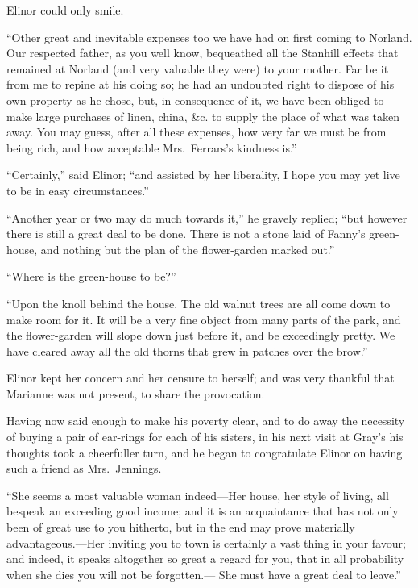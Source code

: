 Elinor could only smile.

``Other great and inevitable expenses too we have
had on first coming to Norland.  Our respected father,
as you well know, bequeathed all the Stanhill effects
that remained at Norland (and very valuable they were)
to your mother.  Far be it from me to repine at his
doing so; he had an undoubted right to dispose of his
own property as he chose, but, in consequence of it,
we have been obliged to make large purchases of linen,
china, \&c. to supply the place of what was taken away.
You may guess, after all these expenses, how very far we
must be from being rich, and how acceptable Mrs.\ Ferrars's
kindness is.''

``Certainly,'' said Elinor; ``and assisted by her liberality,
I hope you may yet live to be in easy circumstances.''

``Another year or two may do much towards it,''
he gravely replied; ``but however there is still a great
deal to be done.  There is not a stone laid of Fanny's
green-house, and nothing but the plan of the flower-garden
marked out.''

``Where is the green-house to be?''

``Upon the knoll behind the house.  The old
walnut trees are all come down to make room for it.
It will be a very fine object from many parts of the park,
and the flower-garden will slope down just before it,
and be exceedingly pretty.  We have cleared away all the old
thorns that grew in patches over the brow.''

Elinor kept her concern and her censure to herself;
and was very thankful that Marianne was not present,
to share the provocation.

Having now said enough to make his poverty clear,
and to do away the necessity of buying a pair of ear-rings
for each of his sisters, in his next visit at Gray's
his thoughts took a cheerfuller turn, and he began to
congratulate Elinor on having such a friend as Mrs.\ Jennings.

``She seems a most valuable woman indeed---Her house,
her style of living, all bespeak an exceeding good income;
and it is an acquaintance that has not only been
of great use to you hitherto, but in the end may prove
materially advantageous.---Her inviting you to town is
certainly a vast thing in your favour; and indeed, it
speaks altogether so great a regard for you, that in all
probability when she dies you will not be forgotten.---%
She must have a great deal to leave.''

